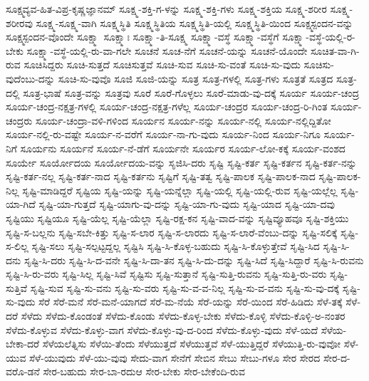 {ಸೂಕ್ಷ್ಮವ್ಯವ-ಹಿತ-ವಿಪ್ರ-ಕೃಷ್ಣಜ್ಞಾನಮ್
ಸೂಕ್ಷ್ಮ-ಶಕ್ತಿ-ಗ-ಳನ್ನು
ಸೂಕ್ಷ್ಮ-ಶಕ್ತಿ-ಗಳು
ಸೂಕ್ಷ್ಮ-ಶಕ್ತಿಯ
ಸೂಕ್ಷ್ಮ-ಶರೀರ
ಸೂಕ್ಷ್ಮ-ಶರೀರವು
ಸೂಕ್ಷ್ಮ-ಸೂಕ್ಷ್ಮ-ವಾಗಿ
ಸೂಕ್ಷ್ಮಸ್ಥಿತಿ
ಸೂಕ್ಷ್ಮಸ್ಥಿತಿಯ
ಸೂಕ್ಷ್ಮಸ್ಥಿತಿ-ಯಲ್ಲಿ
ಸೂಕ್ಷ್ಮಸ್ಥಿತಿ-ಯಿಂದ
ಸೂಕ್ಷ್ಮಸ್ಪಂದನ-ವನ್ನು
ಸೂಕ್ಷ್ಮಸ್ಪಂದನ-ವೊಂದೇ
ಸೂಕ್ಷ್ಮಾ
ಸೂಕ್ಷ್ಮಾಃ
ಸೂಕ್ಷ್ಮಾ-ತಿ-ಸೂಕ್ಷ್ಮ
ಸೂಕ್ಷ್ಮಾ-ವಸ್ಥೆ
ಸೂಕ್ಷ್ಮಾ-ವಸ್ಥೆಗೆ
ಸೂಕ್ಷ್ಮಾ-ವಸ್ಥೆ-ಯಲ್ಲಿ-ರ-ಬೇಕು
ಸೂಕ್ಷ್ಮಾ-ವಸ್ಥೆ-ಯಲ್ಲಿ-ರು-ವಾ-ಗಲೇ
ಸೂಚನೆ
ಸೂಚ-ನೆಗೆ
ಸೂಚನೆ-ಯನ್ನು
ಸೂಚನೆ-ಯೊಂದೇ
ಸೂಚಿತ-ವಾ-ಗಿ-ರುವ
ಸೂಚಿಸಿದ್ದರು
ಸೂಚಿ-ಸುತ್ತದೆ
ಸೂಚಿಸುತ್ತವೆ
ಸೂಚಿ-ಸುವ
ಸೂಚಿ-ಸು-ವಂತೆ
ಸೂಚಿ-ಸು-ವುದು
ಸೂಚಿಸು-ವುದೆಂಬು-ದನ್ನು
ಸೂಚಿ-ಸು-ವುವೊ
ಸೂಜಿ
ಸೂಜಿ-ಯನ್ನು
ಸೂತ್ರ
ಸೂತ್ರ-ಗಳಲ್ಲಿ
ಸೂತ್ರ-ಗಳು
ಸೂತ್ರತೆ
ಸೂತ್ರದ
ಸೂತ್ರ-ದಲ್ಲಿ
ಸೂತ್ರ-ಭಾಷೆ
ಸೂತ್ರ-ವನ್ನು
ಸೂತ್ರವು
ಸೂರೆ
ಸೂರೆ-ಗೊಳ್ಳಲು
ಸೂರೆ-ಮಾಡು-ವು-ದಕ್ಕೆ
ಸೂರ್ಯ
ಸೂರ್ಯ-ಚಂದ್ರ
ಸೂರ್ಯ-ಚಂದ್ರ-ನಕ್ಷತ್ರ-ಗಳಲ್ಲಿ
ಸೂರ್ಯ-ಚಂದ್ರ-ನಕ್ಷತ್ರ-ಗಳೆಲ್ಲ
ಸೂರ್ಯ-ಚಂದ್ರರ
ಸೂರ್ಯ-ಚಂದ್ರ-ರಿ-ಗಿಂತ
ಸೂರ್ಯ-ಚಂದ್ರರು
ಸೂರ್ಯ-ಚಂದ್ರಾ-ವಳಿ-ಗಳಿಂದ
ಸೂರ್ಯನ
ಸೂರ್ಯ-ನನ್ನು
ಸೂರ್ಯ-ನಲ್ಲಿ
ಸೂರ್ಯ-ನಲ್ಲಿದ್ದಿತೋ
ಸೂರ್ಯ-ನಲ್ಲಿ-ರು-ವಷ್ಟೇ
ಸೂರ್ಯ-ನ-ವರೆಗೆ
ಸೂರ್ಯ-ನಾ-ಗು-ವುದು
ಸೂರ್ಯ-ನಿಂದ
ಸೂರ್ಯ-ನಿಗೂ
ಸೂರ್ಯ-ನಿಗೆ
ಸೂರ್ಯನು
ಸೂರ್ಯನೆ
ಸೂರ್ಯ-ನೆ-ಡೆಗೆ
ಸೂರ್ಯನೇ
ಸೂರ್ಯರ
ಸೂರ್ಯ-ಲೋ-ಕಕ್ಕೆ
ಸೂರ್ಯ-ವಂಶದ
ಸೂರ್ಯೇ
ಸೂರ್ಯೋದಯ
ಸೂರ್ಯೋದಯ-ವನ್ನು
ಸೃಜಿಸಿ-ದರು
ಸೃಷ್ಟಿ
ಸೃಷ್ಟಿ-ಕರ್ತ
ಸೃಷ್ಟಿ-ಕರ್ತನ
ಸೃಷ್ಟಿ-ಕರ್ತ-ನನ್ನು
ಸೃಷ್ಟಿ-ಕರ್ತ-ನಲ್ಲ
ಸೃಷ್ಟಿ-ಕರ್ತ-ನಾದ
ಸೃಷ್ಟಿ-ಕರ್ತನು
ಸೃಷ್ಟಿಗೆ
ಸೃಷ್ಟಿ-ತತ್ವ
ಸೃಷ್ಟಿ-ಪಾಲಕ
ಸೃಷ್ಟಿ-ಪಾಲಕ-ನಾದ
ಸೃಷ್ಟಿ-ಪಾಲಕ-ನಿಲ್ಲ
ಸೃಷ್ಟಿ-ಮಾಡಿದ್ದರೆ
ಸೃಷ್ಟಿಯ
ಸೃಷ್ಟಿ-ಯನ್ನು
ಸೃಷ್ಟಿ-ಯನ್ನೆಲ್ಲಾ
ಸೃಷ್ಟಿ-ಯಲ್ಲಿ
ಸೃಷ್ಟಿ-ಯಲ್ಲಿ-ರುವ
ಸೃಷ್ಟಿ-ಯಲ್ಲೆಲ್ಲ
ಸೃಷ್ಟಿ-ಯಾ-ಗಿದೆ
ಸೃಷ್ಟಿ-ಯಾ-ಗುತ್ತದೆ
ಸೃಷ್ಟಿ-ಯಾಗು-ವು-ದನ್ನು
ಸೃಷ್ಟಿ-ಯಾ-ಗು-ವುದು
ಸೃಷ್ಟಿ-ಯಾದ
ಸೃಷ್ಟಿ-ಯಾ-ದವು
ಸೃಷ್ಟಿಯು
ಸೃಷ್ಟಿಯೂ
ಸೃಷ್ಟಿ-ಯೆಲ್ಲ
ಸೃಷ್ಟಿ-ಯೆಲ್ಲಾ
ಸೃಷ್ಟಿ-ರಕ್ಷ-ಕನ
ಸೃಷ್ಟಿ-ವಾದ-ವನ್ನು
ಸೃಷ್ಟಿವ್ಯೂಹವೂ
ಸೃಷ್ಟಿ-ಶಕ್ತಿಯು
ಸೃಷ್ಟಿ-ಸ-ಬಲ್ಲನು
ಸೃಷ್ಟಿ-ಸಬೇ-ಕಿತ್ತು
ಸೃಷ್ಟಿ-ಸ-ಲಾರ
ಸೃಷ್ಟಿ-ಸ-ಲಾರದು
ಸೃಷ್ಟಿ-ಸ-ಲಾರೆ-ವೆಂಬು-ದನ್ನು
ಸೃಷ್ಟಿ-ಸಲಿಕ್ಕೆ
ಸೃಷ್ಟಿ-ಸ-ಲಿಲ್ಲ
ಸೃಷ್ಟಿ-ಸಲು
ಸೃಷ್ಟಿ-ಸಲ್ಪಟ್ಟದ್ದಲ್ಲ
ಸೃಷ್ಟಿಸಿ
ಸೃಷ್ಟಿ-ಸಿ-ಕೊಳ್ಳ-ಬಹುದು
ಸೃಷ್ಟಿ-ಸಿ-ಕೊಳ್ಳುತ್ತೇವೆ
ಸೃಷ್ಟಿ-ಸಿದ
ಸೃಷ್ಟಿ-ಸಿ-ದನು
ಸೃಷ್ಟಿ-ಸಿ-ದರು
ಸೃಷ್ಟಿ-ಸಿ-ದ-ವನೇ
ಸೃಷ್ಟಿ-ಸಿ-ದಾ-ತನ
ಸೃಷ್ಟಿ-ಸಿ-ದು-ದನ್ನು
ಸೃಷ್ಟಿ-ಸಿದೆ
ಸೃಷ್ಟಿ-ಸಿದ್ದಾರೆ
ಸೃಷ್ಟಿ-ಸಿ-ರುವನು
ಸೃಷ್ಟಿ-ಸಿ-ರು-ವರು
ಸೃಷ್ಟಿ-ಸಿಲ್ಲ
ಸೃಷ್ಟಿ-ಸಿವೆ
ಸೃಷ್ಟಿಸು
ಸೃಷ್ಟಿ-ಸುತ್ತಾನೆ
ಸೃಷ್ಟಿ-ಸುತ್ತಿ-ರುವನು
ಸೃಷ್ಟಿ-ಸುತ್ತಿ-ರು-ವರು
ಸೃಷ್ಟಿ-ಸುತ್ತಿವೆ
ಸೃಷ್ಟಿ-ಸುವ
ಸೃಷ್ಟಿ-ಸು-ವನು
ಸೃಷ್ಟಿ-ಸು-ವರು
ಸೃಷ್ಟಿ-ಸು-ವ-ವ-ನಿಲ್ಲ
ಸೃಷ್ಟಿ-ಸು-ವ-ವನು
ಸೃಷ್ಟಿ-ಸು-ವು-ದಕ್ಕೆ
ಸೃಷ್ಟಿ-ಸು-ವುದು
ಸೆರೆ
ಸೆರೆ-ಮನೆ
ಸೆರೆ-ಮನೆ-ಯಾಗದೆ
ಸೆರೆ-ಮ-ನೆಯೆ
ಸೆರೆ-ಯನ್ನು
ಸೆರೆ-ಯಿಂದ
ಸೆರೆ-ಹಿಡಿದು
ಸೆಳೆ-ತಕ್ಕೆ
ಸೆಳೆ-ದರೆ
ಸೆಳೆದು
ಸೆಳೆದು-ಕೊಂಡಂತೆ
ಸೆಳೆದು-ಕೊಂಡು
ಸೆಳೆದು-ಕೊಳ್ಳ-ಬೇಕು
ಸೆಳೆದು-ಕೊಳ್ಳಿ
ಸೆಳೆದು-ಕೊಳ್ಳಿ-ಅ-ನಂತರ
ಸೆಳೆದು-ಕೊಳ್ಳುವ
ಸೆಳೆದು-ಕೊಳ್ಳು-ವಾಗ
ಸೆಳೆದು-ಕೊಳ್ಳು-ವು-ದ-ರಿಂದ
ಸೆಳೆದು-ಕೊಳ್ಳು-ವುದು
ಸೆಳೆ-ಯದೆ
ಸೆಳೆಯ-ಬೇಕಾ-ದರೆ
ಸೆಳೆಯಲೆತ್ನಿಸು
ಸೆಳೆಯಿ-ತೆಂದು
ಸೆಳೆಯುತ್ತದೆ
ಸೆಳೆಯುತ್ತವೆ
ಸೆಳೆ-ಯುತ್ತಿದ್ದರೆ
ಸೆಳೆಯುತ್ತಿ-ರು-ವುವೋ
ಸೆಳೆ-ಯುವ
ಸೆಳೆ-ಯುವುದು
ಸೆಳೆ-ಯು-ವುವು
ಸೇದು-ವಾಗ
ಸೇನೆಗೆ
ಸೇಬಿನ
ಸೇಬು
ಸೇಬು-ಗಳೂ
ಸೇರ
ಸೇರದ
ಸೇರ-ದ-ವರೊ-ಡನೆ
ಸೇರ-ಬಹುದು
ಸೇರ-ಬಾ-ರದುಆ
ಸೇರ-ಬೇಕು
ಸೇರ-ಬೇಕೆಂದಿ-ರುವ
}
